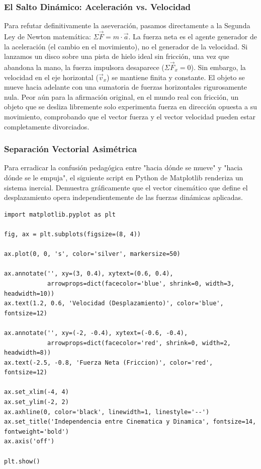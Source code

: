 \documentclass[12pt]{article}
\begin{document}
\subsubsection*{El Salto Dinámico: Aceleración vs. Velocidad}
Para refutar definitivamente la aseveración, pasamos directamente a la Segunda Ley de Newton matemática: $\Sigma \vec{F} = m \cdot \vec{a}$. 
La fuerza neta es el agente generador de la aceleración (el cambio en el movimiento), no el generador de la velocidad. 
Si lanzamos un disco sobre una pista de hielo ideal sin fricción, una vez que abandona la mano, la fuerza impulsora desaparece ($\Sigma \vec{F}_x = 0$). Sin embargo, la velocidad en el eje horizontal ($\vec{v}_x$) se mantiene finita y constante. El objeto se mueve hacia adelante con una sumatoria de fuerzas horizontales rigurosamente nula. Peor aún para la afirmación original, en el mundo real con fricción, un objeto que se desliza libremente solo experimenta fuerza en dirección opuesta a su movimiento, comprobando que el vector fuerza y el vector velocidad pueden estar completamente divorciados.

\subsubsection*{Separación Vectorial Asimétrica}
Para erradicar la confusión pedagógica entre "hacia dónde se mueve" y "hacia dónde se le empuja", el siguiente script en Python de Matplotlib renderiza un sistema inercial. Demuestra gráficamente que el vector cinemático que define el desplazamiento opera independientemente de las fuerzas dinámicas aplicadas.

\begin{lstlisting}
import matplotlib.pyplot as plt

fig, ax = plt.subplots(figsize=(8, 4))

ax.plot(0, 0, 's', color='silver', markersize=50)

ax.annotate('', xy=(3, 0.4), xytext=(0.6, 0.4), 
            arrowprops=dict(facecolor='blue', shrink=0, width=3, headwidth=10))
ax.text(1.2, 0.6, 'Velocidad (Desplazamiento)', color='blue', fontsize=12)

ax.annotate('', xy=(-2, -0.4), xytext=(-0.6, -0.4), 
            arrowprops=dict(facecolor='red', shrink=0, width=2, headwidth=8))
ax.text(-2.5, -0.8, 'Fuerza Neta (Friccion)', color='red', fontsize=12)

ax.set_xlim(-4, 4)
ax.set_ylim(-2, 2)
ax.axhline(0, color='black', linewidth=1, linestyle='--')
ax.set_title('Independencia entre Cinematica y Dinamica', fontsize=14, fontweight='bold')
ax.axis('off')

plt.show()
\end{lstlisting}
\end{document}
